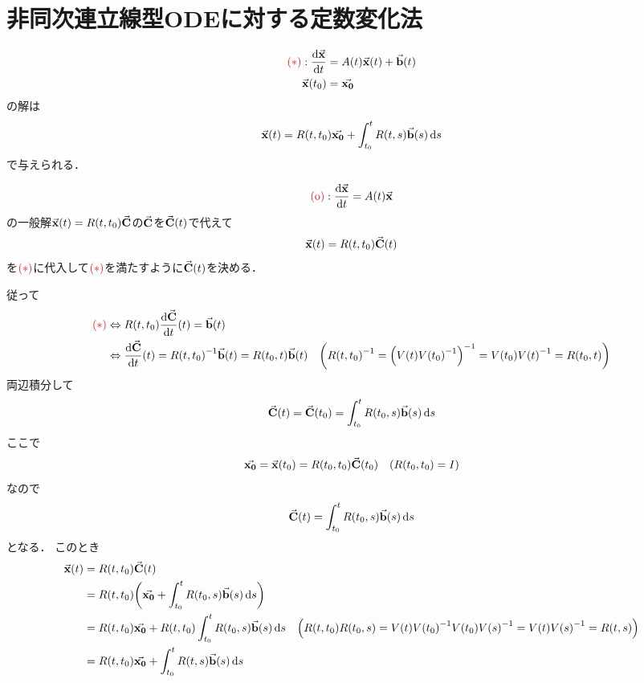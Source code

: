 \documentclass[autodetect-engine,dvipdfmx-if-dvi,ja=standard]{bxjsarticle}
\makeatletter
\theoremstyle{mystyle1}
\theoremstyle{mystyle2}
\renewenvironment{proof}[1][\proofname]{\par
  \pushQED{\qed}%
  \normalfont
  \topsep6\p@\@plus6\p@ \trivlist
  \item[\hskip\labelsep{\bfseries\sffamily #1}]\ignorespaces
}{%
  \popQED\endtrivlist\@endpefalse
}
\renewcommand\proofname{\ensuremath{\because}}
\newcommand{\redast}{\ensuremath{\color{red}\qty(\ast)\color{black}}}
\newcommand{\redo}{\ensuremath{\color{red}\qty(\textrm{o})\color{black}}}
\makeatother
\begin{document}
\section{非同次連立線型ODEに対する定数変化法}
\begin{align*}
  \redast:\dv{\va{x}}{t} & =A\qty(t)\va{x}\qty(t)+\va{b}\qty(t) \\
  \va{x}\qty(t_0)        & =\va{x_0}
\end{align*}
の解は
\[\va{x}\qty(t)=R\qty(t,t_0)\va{x_0}+\int_{t_0}^tR\qty(t,s)\va{b}\qty(s)\dd{s}\]
で与えられる．
\begin{proof}
  \[\redo:\dv{\va{x}}{t}=A\qty(t)\va{x}\]
  の一般解$\va{x}\qty(t)=R\qty(t,t_0)\va{C}$の$\va{C}$を$\va{C}\qty(t)$で代えて
  \[\va{x}\qty(t)=R\qty(t,t_0)\va{C}\qty(t)\]
  を\redast に代入して\redast を満たすように$\va{C}\qty(t)$を決める．
  従って
  \begin{align*}
    \redast
     & \Leftrightarrow R\qty(t,t_0)\dv{\va{C}}{t}\qty(t)=\va{b}\qty(t)                                                                                                                                  \\
     & \Leftrightarrow \dv{\va{C}}{t}\qty(t)=R\qty(t,t_0)^{-1}\va{b}\qty(t)=R\qty(t_0,t)\va{b}\qty(t) & \qty(R\qty(t,t_0)^{-1}=\qty(V\qty(t)V\qty(t_0)^{-1})^{-1}=V\qty(t_0)V\qty(t)^{-1}=R\qty(t_0,t))
  \end{align*}
  両辺積分して
  \[\va{C}\qty(t)=\va{C}\qty(t_0)=\int_{t_0}^tR\qty(t_0,s)\va{b}\qty(s)\dd{s}\]
  ここで
  \[\va{x_0}=\va{x}\qty(t_0)=R\qty(t_0,t_0)\va{C}\qty(t_0)\quad\qty(R\qty(t_0,t_0)=I)\]
  なので
  \[\va{C}\qty(t)=\int_{t_0}^tR\qty(t_0,s)\va{b}\qty(s)\dd{s}\]
  となる．
  このとき
  \begin{align*}
    \va{x}\qty(t)
     & =R\qty(t,t_0)\va{C}\qty(t)                                                                                                                                                                     \\
     & =R\qty(t,t_0)\qty(\va{x_0}+\int_{t_0}^tR\qty(t_0,s)\va{b}\qty(s)\dd{s})                                                                                                                        \\
     & =R\qty(t,t_0)\va{x_0}+R\qty(t,t_0)\int_{t_0}^tR\qty(t_0,s)\va{b}\qty(s)\dd{s} & \qty(R\qty(t,t_0)R\qty(t_0,s)=V\qty(t)V\qty(t_0)^{-1}V\qty(t_0)V\qty(s)^{-1}=V\qty(t)V\qty(s)^{-1}=R\qty(t,s)) \\
     & =R\qty(t,t_0)\va{x_0}+\int_{t_0}^tR\qty(t,s)\va{b}\qty(s)\dd{s}
  \end{align*}
\end{proof}
\end{document}
